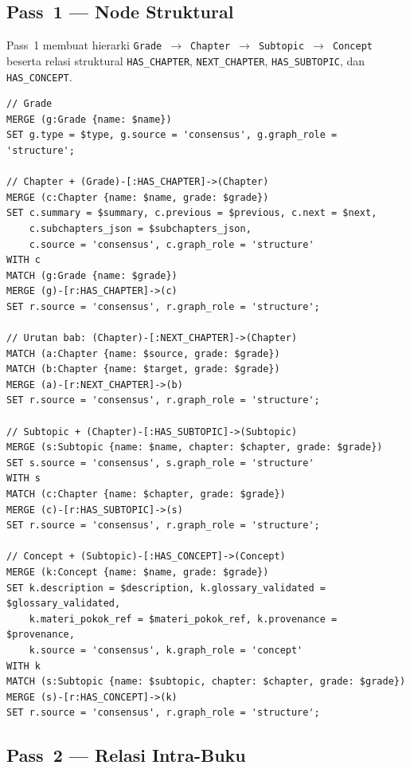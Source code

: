\documentclass[main]{subfiles}
\begin{document}
\subsection{Pass~1 --- Node Struktural}

Pass~1 membuat hierarki \texttt{Grade}~$\rightarrow$~\texttt{Chapter}~$\rightarrow$~\texttt{Subtopic}~$\rightarrow$~\texttt{Concept}
beserta relasi struktural \texttt{HAS\_CHAPTER}, \texttt{NEXT\_CHAPTER},
\texttt{HAS\_SUBTOPIC}, dan \texttt{HAS\_CONCEPT}.

\begin{lstlisting}[style=cypherbox,caption={Pembuatan node dan relasi struktural (Pass~1).},label={lst:cypher-pass1}]
// Grade
MERGE (g:Grade {name: $name})
SET g.type = $type, g.source = 'consensus', g.graph_role = 'structure';

// Chapter + (Grade)-[:HAS_CHAPTER]->(Chapter)
MERGE (c:Chapter {name: $name, grade: $grade})
SET c.summary = $summary, c.previous = $previous, c.next = $next,
    c.subchapters_json = $subchapters_json,
    c.source = 'consensus', c.graph_role = 'structure'
WITH c
MATCH (g:Grade {name: $grade})
MERGE (g)-[r:HAS_CHAPTER]->(c)
SET r.source = 'consensus', r.graph_role = 'structure';

// Urutan bab: (Chapter)-[:NEXT_CHAPTER]->(Chapter)
MATCH (a:Chapter {name: $source, grade: $grade})
MATCH (b:Chapter {name: $target, grade: $grade})
MERGE (a)-[r:NEXT_CHAPTER]->(b)
SET r.source = 'consensus', r.graph_role = 'structure';

// Subtopic + (Chapter)-[:HAS_SUBTOPIC]->(Subtopic)
MERGE (s:Subtopic {name: $name, chapter: $chapter, grade: $grade})
SET s.source = 'consensus', s.graph_role = 'structure'
WITH s
MATCH (c:Chapter {name: $chapter, grade: $grade})
MERGE (c)-[r:HAS_SUBTOPIC]->(s)
SET r.source = 'consensus', r.graph_role = 'structure';

// Concept + (Subtopic)-[:HAS_CONCEPT]->(Concept)
MERGE (k:Concept {name: $name, grade: $grade})
SET k.description = $description, k.glossary_validated = $glossary_validated,
    k.materi_pokok_ref = $materi_pokok_ref, k.provenance = $provenance,
    k.source = 'consensus', k.graph_role = 'concept'
WITH k
MATCH (s:Subtopic {name: $subtopic, chapter: $chapter, grade: $grade})
MERGE (s)-[r:HAS_CONCEPT]->(k)
SET r.source = 'consensus', r.graph_role = 'structure';
\end{lstlisting}

\subsection{Pass~2 --- Relasi Intra-Buku}
\end{document}
